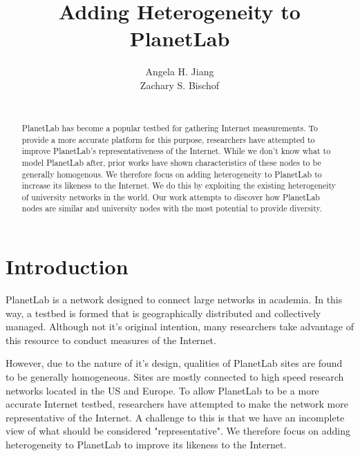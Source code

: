 \documentclass{sig-alternate-10pt}
\begin{document}
\title{Adding Heterogeneity to PlanetLab}

\author{
\alignauthor
Angela H. Jiang\\
\alignauthor
Zachary S. Bischof\\
\\
}


\maketitle
\begin{abstract}

PlanetLab has become a popular testbed for gathering Internet measurements. To
provide a more accurate platform for this purpose, researchers have attempted
to improve PlanetLab's representativeness of the Internet. While we don't know
what to model PlanetLab after, prior works have shown characteristics of these
nodes to be generally homogenous. We therefore focus on adding heterogeneity to
PlanetLab to increase its likeness to the Internet. We do this by exploiting
the existing heterogeneity of university networks in the world. Our work
attempts to discover how PlanetLab nodes are similar and university nodes with
the most potential to provide diversity.

\end{abstract}

\section{Introduction}

PlanetLab is a network designed to connect large networks in academia. In this
way, a testbed is formed that is geographically distributed and collectively
managed. Although not it's original intention, many researchers take advantage
of this resource to conduct measures of the Internet.

However, due to the nature of it's design, qualities of PlanetLab sites are
found to be generally homogeneous. Sites are mostly connected to high speed
research networks located in the US and Europe. To allow PlanetLab to be a more
accurate Internet testbed, researchers have attempted to make the network more
representative of the Internet. A challenge to this is that we have an
incomplete view of what should be considered "representative". We therefore
focus on adding heterogeneity to PlanetLab to improve its likeness to the
Internet.
\end{document}
